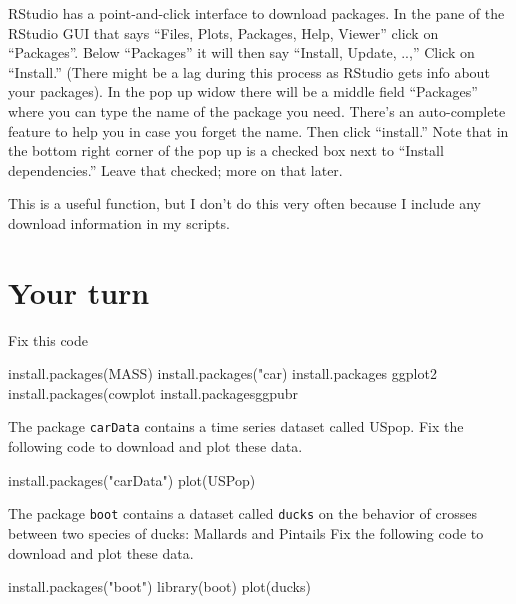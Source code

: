 \documentclass[
]{book}
\newenvironment{Shaded}{\begin{snugshade}}{\end{snugshade}}
\newcommand{\FunctionTok}[1]{\textcolor[rgb]{0.00,0.00,0.00}{#1}}
\newcommand{\NormalTok}[1]{#1}
\newcommand{\StringTok}[1]{\textcolor[rgb]{0.31,0.60,0.02}{#1}}
\begin{document}
RStudio has a point-and-click interface to download packages. In the pane of the RStudio GUI that says ``Files, Plots, Packages, Help, Viewer'' click on ``Packages''. Below ``Packages'' it will then say ``Install, Update, ..,'' Click on ``Install.'' (There might be a lag during this process as RStudio gets info about your packages). In the pop up widow there will be a middle field ``Packages'' where you can type the name of the package you need. There's an auto-complete feature to help you in case you forget the name. Then click ``install.'' Note that in the bottom right corner of the pop up is a checked box next to ``Install dependencies.'' Leave that checked; more on that later.

This is a useful function, but I don't do this very often because I include any download information in my scripts.

\hypertarget{your-turn}{%
\section{Your turn}\label{your-turn}}

Fix this code

\begin{Shaded}
\begin{Highlighting}[]
\FunctionTok{install.packages}\NormalTok{(MASS)}
\FunctionTok{install.packages}\NormalTok{(}\StringTok{"car)}
\StringTok{install.packages ggplot2 }
\StringTok{install.packages(cowplot }
\StringTok{install.packagesggpubr }
\end{Highlighting}
\end{Shaded}

The package \texttt{carData} contains a time series dataset called USpop. Fix the following code to download and plot these data.

\begin{Shaded}
\begin{Highlighting}[]
\FunctionTok{install.packages}\NormalTok{(}\StringTok{"carData"}\NormalTok{)}
\FunctionTok{plot}\NormalTok{(USPop)}
\end{Highlighting}
\end{Shaded}

The package \texttt{boot} contains a dataset called \texttt{ducks} on the behavior of crosses between two species of ducks: Mallards and Pintails Fix the following code to download and plot these data.

\begin{Shaded}
\begin{Highlighting}[]
\FunctionTok{install.packages}\NormalTok{(}\StringTok{"boot"}\NormalTok{)}
\FunctionTok{library}\NormalTok{(boot)}
\FunctionTok{plot}\NormalTok{(ducks)}
\end{Highlighting}
\end{Shaded}
\end{document}
